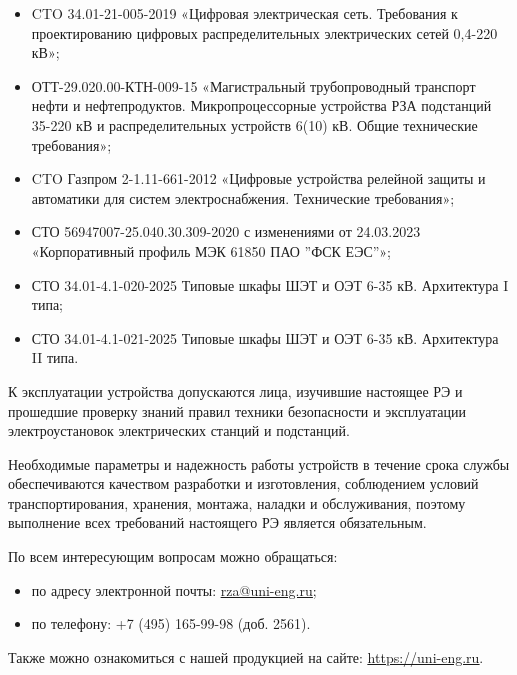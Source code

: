 \begin{itemize}
\item CTO 34.01-21-005-2019 «Цифровая электрическая сеть. Требования к проектированию цифровых распределительных электрических сетей 0,4-220 кВ»;
\item \sloppy ОТТ-29.020.00-КТН-009-15 «Магистральный трубопроводный транспорт нефти и нефтепродуктов. Микропроцессорные устройства РЗА подстанций 35-220 кВ и распределительных устройств 6(10) кВ. Общие технические требования»;
\item CTO Газпром 2-1.11-661-2012 «Цифровые устройства релейной защиты и автоматики для систем электроснабжения. Технические требования»;
\item СТО 56947007-25.040.30.309-2020 с изменениями от 24.03.2023 «Корпоративный профиль МЭК 61850 ПАО ''ФСК ЕЭС''»;
\item СТО 34.01-4.1-020-2025 Типовые шкафы ШЭТ и ОЭТ 6-35 кВ. Архитектура I типа;
\item СТО 34.01-4.1-021-2025 Типовые шкафы ШЭТ и ОЭТ 6-35 кВ. Архитектура II типа.

\end{itemize}

\par
К эксплуатации устройства допускаются лица, изучившие настоящее РЭ и прошедшие проверку знаний правил техники безопасности и эксплуатации электроустановок электрических станций и подстанций.

\par
Необходимые параметры и надежность работы устройств в течение срока службы обеспечиваются качеством разработки и изготовления, соблюдением условий транспортирования, хранения, монтажа, наладки и обслуживания, поэтому выполнение всех требований настоящего РЭ является обязательным.
\par
По всем интересующим вопросам можно обращаться:
\begin{itemize}
\item по адресу электронной почты: \href{mailto:rza@uni-eng.ru}{\color{unigreen}\uline{rza@uni-eng.ru}};
\item по телефону: +7 (495) 165-99-98 (доб. 2561).
\end{itemize}
Также можно ознакомиться с нашей продукцией на сайте: \href{https://uni-eng.ru}{\color{unigreen}\uline{https://uni-eng.ru}}.

